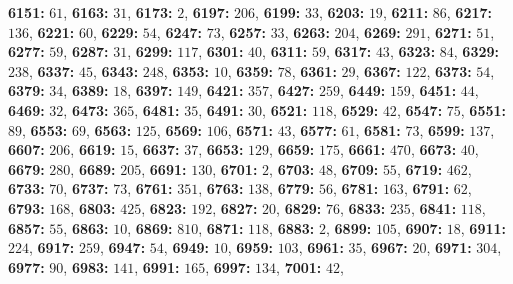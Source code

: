 \textsf{\bfseries 6151:} $61$, \textsf{\bfseries 6163:} $31$, \textsf{\bfseries 6173:} $2$, \textsf{\bfseries 6197:} $206$, \textsf{\bfseries 6199:} $33$, \textsf{\bfseries 6203:} $19$, \textsf{\bfseries 6211:} $86$, \textsf{\bfseries 6217:} $136$, \textsf{\bfseries 6221:} $60$, \textsf{\bfseries 6229:} $54$, \textsf{\bfseries 6247:} $73$, \textsf{\bfseries 6257:} $33$, \textsf{\bfseries 6263:} $204$, \textsf{\bfseries 6269:} $291$, \textsf{\bfseries 6271:} $51$, \textsf{\bfseries 6277:} $59$, \textsf{\bfseries 6287:} $31$, \textsf{\bfseries 6299:} $117$, \textsf{\bfseries 6301:} $40$, \textsf{\bfseries 6311:} $59$, \textsf{\bfseries 6317:} $43$, \textsf{\bfseries 6323:} $84$, \textsf{\bfseries 6329:} $238$, \textsf{\bfseries 6337:} $45$, \textsf{\bfseries 6343:} $248$, \textsf{\bfseries 6353:} $10$, \textsf{\bfseries 6359:} $78$, \textsf{\bfseries 6361:} $29$, \textsf{\bfseries 6367:} $122$, \textsf{\bfseries 6373:} $54$, \textsf{\bfseries 6379:} $34$, \textsf{\bfseries 6389:} $18$, \textsf{\bfseries 6397:} $149$, \textsf{\bfseries 6421:} $357$, \textsf{\bfseries 6427:} $259$, \textsf{\bfseries 6449:} $159$, \textsf{\bfseries 6451:} $44$, \textsf{\bfseries 6469:} $32$, \textsf{\bfseries 6473:} $365$, \textsf{\bfseries 6481:} $35$, \textsf{\bfseries 6491:} $30$, \textsf{\bfseries 6521:} $118$, \textsf{\bfseries 6529:} $42$, \textsf{\bfseries 6547:} $75$, \textsf{\bfseries 6551:} $89$, \textsf{\bfseries 6553:} $69$, \textsf{\bfseries 6563:} $125$, \textsf{\bfseries 6569:} $106$, \textsf{\bfseries 6571:} $43$, \textsf{\bfseries 6577:} $61$, \textsf{\bfseries 6581:} $73$, \textsf{\bfseries 6599:} $137$, \textsf{\bfseries 6607:} $206$, \textsf{\bfseries 6619:} $15$, \textsf{\bfseries 6637:} $37$, \textsf{\bfseries 6653:} $129$, \textsf{\bfseries 6659:} $175$, \textsf{\bfseries 6661:} $470$, \textsf{\bfseries 6673:} $40$, \textsf{\bfseries 6679:} $280$, \textsf{\bfseries 6689:} $205$, \textsf{\bfseries 6691:} $130$, \textsf{\bfseries 6701:} $2$, \textsf{\bfseries 6703:} $48$, \textsf{\bfseries 6709:} $55$, \textsf{\bfseries 6719:} $462$, \textsf{\bfseries 6733:} $70$, \textsf{\bfseries 6737:} $73$, \textsf{\bfseries 6761:} $351$, \textsf{\bfseries 6763:} $138$, \textsf{\bfseries 6779:} $56$, \textsf{\bfseries 6781:} $163$, \textsf{\bfseries 6791:} $62$, \textsf{\bfseries 6793:} $168$, \textsf{\bfseries 6803:} $425$, \textsf{\bfseries 6823:} $192$, \textsf{\bfseries 6827:} $20$, \textsf{\bfseries 6829:} $76$, \textsf{\bfseries 6833:} $235$, \textsf{\bfseries 6841:} $118$, \textsf{\bfseries 6857:} $55$, \textsf{\bfseries 6863:} $10$, \textsf{\bfseries 6869:} $810$, \textsf{\bfseries 6871:} $118$, \textsf{\bfseries 6883:} $2$, \textsf{\bfseries 6899:} $105$, \textsf{\bfseries 6907:} $18$, \textsf{\bfseries 6911:} $224$, \textsf{\bfseries 6917:} $259$, \textsf{\bfseries 6947:} $54$, \textsf{\bfseries 6949:} $10$, \textsf{\bfseries 6959:} $103$, \textsf{\bfseries 6961:} $35$, \textsf{\bfseries 6967:} $20$, \textsf{\bfseries 6971:} $304$, \textsf{\bfseries 6977:} $90$, \textsf{\bfseries 6983:} $141$, \textsf{\bfseries 6991:} $165$, \textsf{\bfseries 6997:} $134$, \textsf{\bfseries 7001:} $42$, 
